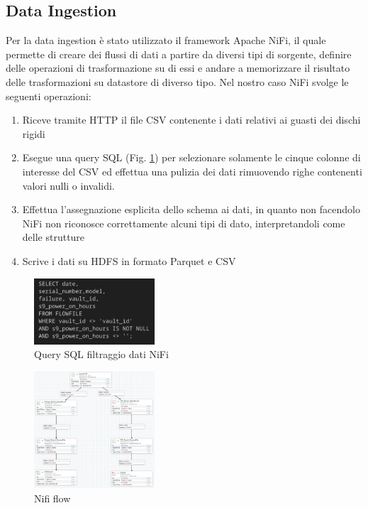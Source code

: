 \documentclass[conference]{IEEEtran}
\begin{document}
\subsection{Data Ingestion}
Per la data ingestion è stato utilizzato il framework Apache NiFi, il quale permette di creare dei flussi di dati a partire da diversi tipi di sorgente, definire delle operazioni di trasformazione su di essi e andare a memorizzare il risultato delle trasformazioni su datastore di diverso tipo. Nel nostro caso NiFi svolge le seguenti operazioni:
\begin{enumerate}
    \item Riceve tramite HTTP il file CSV contenente i dati relativi ai guasti dei dischi rigidi
    \item Esegue una query SQL (Fig. \ref{fig:nifi_query}) per selezionare solamente le cinque colonne di interesse del CSV ed effettua una pulizia dei dati rimuovendo righe contenenti valori nulli o invalidi. 
    \item Effettua l'assegnazione esplicita dello schema ai dati, in quanto non facendolo NiFi non riconosce correttamente alcuni tipi di dato, interpretandoli come delle strutture
    \item Scrive i dati su HDFS in formato Parquet e CSV
\end{enumerate}
\begin{figure}[H]
    \centering
    \includegraphics[width=0.4\textwidth]{./res/query_nifi.png}
    \caption{Query SQL filtraggio dati NiFi}
    \label{fig:nifi_query}
\end{figure} 
\begin{figure}[H]
    \centering
    \includegraphics[width=0.4\textwidth]{./res/nifi_flow.png}
    \caption{Nifi flow}
    \label{fig:nifi_flow}
\end{figure} 
\end{document}
